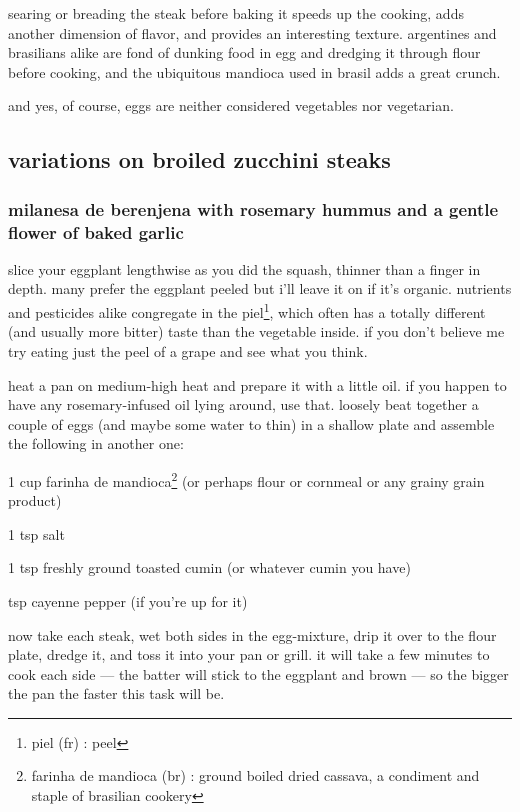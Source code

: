 searing or breading the steak before baking it speeds up the cooking,
adds another dimension of flavor, and provides an interesting
texture. argentines and brasilians alike are fond of dunking food in
egg and dredging it through flour before cooking, and the ubiquitous
mandioca used in brasil adds a great crunch.

and yes, of course, eggs are neither considered vegetables nor
vegetarian.

\subsection{variations on broiled zucchini steaks}

\subsubsection{milanesa de berenjena with rosemary hummus and a gentle flower of baked garlic}

slice your eggplant lengthwise as you did the squash, thinner than a
finger in depth. many prefer the eggplant peeled but i'll leave it on
if it's organic. nutrients and pesticides alike congregate in the
piel\footnote{piel (fr) : peel}, which often has a totally different
(and usually more bitter) taste than the vegetable inside. if you
don't believe me try eating just the peel of a grape and see what you
think.

heat a pan on medium-high heat and prepare it with a little oil. if
you happen to have any rosemary-infused oil lying around, use
that. loosely beat together a couple of eggs (and maybe some water to
thin) in a shallow plate and assemble the following in another one:

\begin{ingredients}
  \item 1 cup farinha de mandioca\footnote{farinha de mandioca (br) :
  ground boiled dried cassava, a condiment and staple of brasilian
  cookery} (or perhaps flour or cornmeal or any grainy grain product)
  \item 1 tsp salt
  \item 1 tsp freshly ground toasted cumin (or whatever cumin you have)
  \item \onequarter tsp cayenne pepper (if you're up for it)
\end{ingredients}

now take each steak, wet both sides in the egg-mixture, drip it over
to the flour plate, dredge it, and toss it into your pan or grill. it
will take a few minutes to cook each side --- the batter will stick to
the eggplant and brown --- so the bigger the pan the faster this task
will be.

